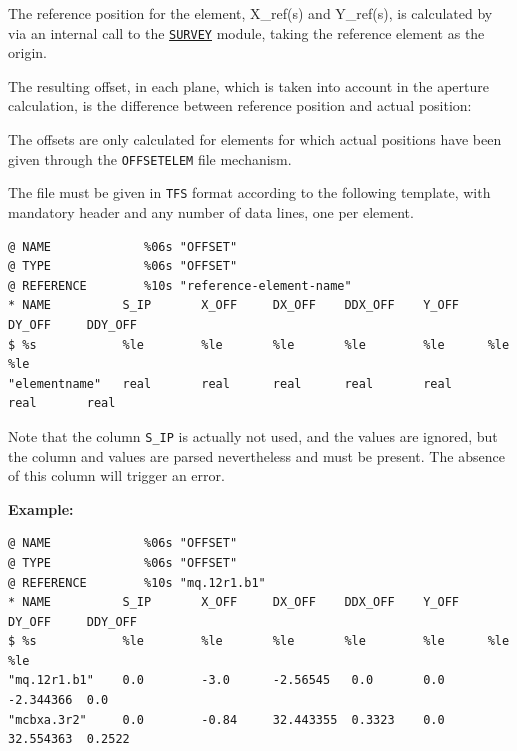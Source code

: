 The reference position for the element, X\_ref(s) and Y\_ref(s), is
calculated  by \madx via an internal call to the
\hyperref[chap:survey]{\texttt{SURVEY}} module, taking the reference element
as the origin.   

The resulting offset, in each plane, which is taken into account in the
aperture calculation, is the difference between reference position and
actual position:  

The offsets are only calculated for elements for which actual positions 
have been given through the \texttt{OFFSETELEM} file mechanism. 

The file must be given in \texttt{TFS} format according to the following
template, with mandatory header and any number of data lines, one per element. 

{\footnotesize
\begin{verbatim}
@ NAME             %06s "OFFSET" 
@ TYPE             %06s "OFFSET" 
@ REFERENCE        %10s "reference-element-name" 
* NAME          S_IP       X_OFF     DX_OFF    DDX_OFF    Y_OFF    DY_OFF     DDY_OFF
$ %s            %le        %le       %le       %le        %le      %le        %le
"elementname"   real       real      real      real       real     real       real
\end{verbatim}}

Note that the column \texttt{S\_IP} is actually not used, and the values
are ignored, but the column and values are parsed nevertheless and must
be present. The absence of this column will trigger an error. 

\textbf{Example:}
{\footnotesize
\begin{verbatim}
@ NAME             %06s "OFFSET" 
@ TYPE             %06s "OFFSET" 
@ REFERENCE        %10s "mq.12r1.b1" 
* NAME          S_IP       X_OFF     DX_OFF    DDX_OFF    Y_OFF    DY_OFF     DDY_OFF
$ %s            %le        %le       %le       %le        %le      %le        %le
"mq.12r1.b1"    0.0        -3.0      -2.56545   0.0       0.0      -2.344366  0.0
"mcbxa.3r2"     0.0        -0.84     32.443355  0.3323    0.0      32.554363  0.2522
\end{verbatim}}


